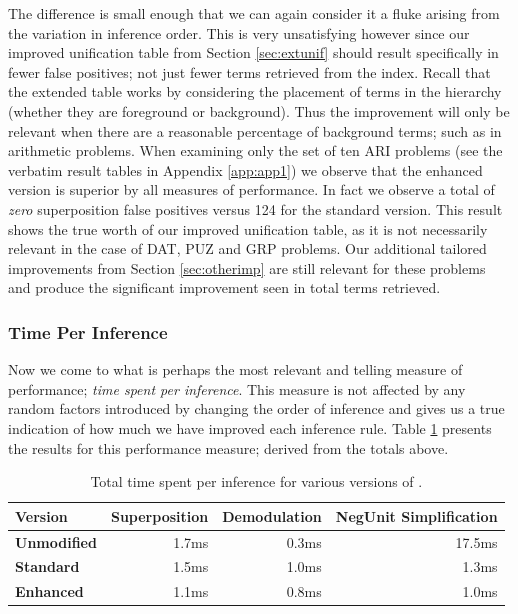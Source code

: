 The difference is small enough that we can again consider it a fluke arising from
the variation in inference order. This is very unsatisfying however since our
improved unification table from Section \ref{sec:extunif} should result specifically
in fewer false positives; not just fewer terms retrieved from the index. 
Recall that the extended table works by considering the placement of terms
in the hierarchy (whether they are foreground or background). Thus the improvement will only
be relevant when there are a reasonable percentage of background terms; such as in
arithmetic problems.
When examining only the set of ten ARI problems 
(see the verbatim result tables in Appendix \ref{app:app1}) we observe
that the enhanced version is superior by all measures of performance.
In fact we observe a total of \emph{zero}
superposition false positives versus 124 for the standard version. This result shows the true worth of our
improved unification table, as it is not necessarily relevant in the case of DAT, PUZ
and GRP problems. Our additional tailored improvements from Section \ref{sec:otherimp}
are still relevant for these problems and produce the significant improvement
seen in total terms retrieved.

\subsubsection{Time Per Inference}

Now we come to what is perhaps the most relevant and telling measure of performance;
\emph{time spent per inference}. This measure is not affected by any random factors
introduced by changing the order of inference and gives us a true indication of how
much we have improved each inference rule. Table \ref{tab:peri} presents the results
for this performance measure; derived from the totals above.

 \begin{table}[H]\begin{center}
  \caption{Total time spent per inference for various versions of \beagle.}
  \label{tab:peri}
\begin{tabular}{| l || r | r | r |}  \hline
Version&Superposition&Demodulation&NegUnit Simplification\\  \hline
\textbf{Unmodified}&1.7ms & 0.3ms & 17.5ms  \\
\textbf{Standard}  &1.5ms & 1.0ms & 1.3ms  \\
\textbf{Enhanced}  &1.1ms & 0.8ms & 1.0ms  \\\hline
\end{tabular}\end{center}\end{table}  

